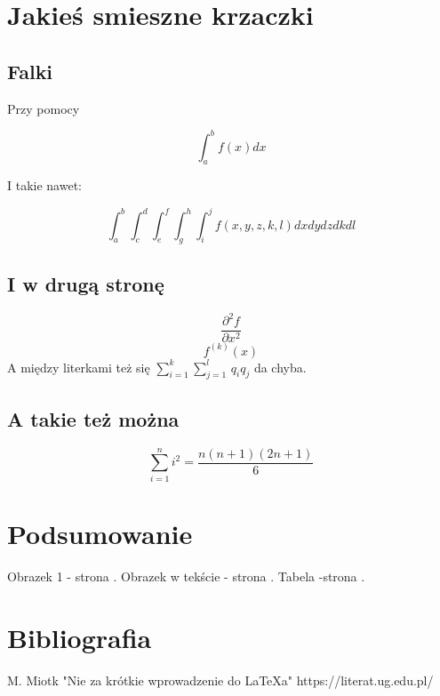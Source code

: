 \documentclass{article}
\begin{document}
\newpage
\section{Jakieś smieszne krzaczki}

\subsection{Falki} 

Przy pomocy \cite{Miotk}

$$\int_{a}^b f(x)dx$$

I takie nawet:

$$\int_{a}^b\int_{c}^d\int_{e}^f\int_{g}^h\int_{i}^j f(x,y,z,k,l)dxdydzdkdl$$

\subsection{I w drugą stronę} 

$$\frac{\partial^2 f}{\partial x^2}$$  $$f^{(k)}(x)$$
A między literkami też się $\sum^k_{i=1}\sum^l_{j=1}\,q_i q_j$ da chyba.

\subsection{A takie też można} 

$$\sum_{i=1}^n i^2 = \frac{n(n+1)(2n+1)}{6}$$

\section{Podsumowanie}

Obrazek 1 - strona \pageref{o0}.
Obrazek w tekście - strona \pageref{o1}.
Tabela -strona \pageref{tab}.

\newpage
\section{Bibliografia}\label{bb}
\begin{thebibliography}{2}
M. Miotk "Nie za krótkie wprowadzenie do LaTeXa"
https://literat.ug.edu.pl/
\end{thebibliography}
\end{document}
